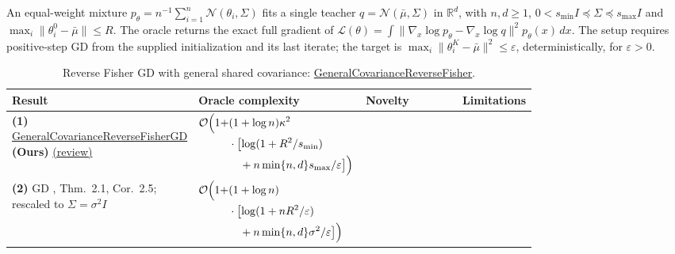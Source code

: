 \begin{table}[tp]
\centering
\caption{Reverse Fisher GD with general shared covariance: \href{https://github.com/k3nfalt/longtails/blob/main/LongTails/Setups/GeneralCovarianceReverseFisher.lean}{GeneralCovarianceReverseFisher}.}\label{tab:GeneralCovarianceReverseFisher}
\parbox{\linewidth}{\footnotesize An equal-weight mixture $p_\theta=n^{-1}\sum_{i=1}^n\mathcal{N}(\theta_i,\Sigma)$ fits a single teacher $q=\mathcal{N}(\bar\mu,\Sigma)$ in $\mathbb{R}^d$, with $n,d\ge1$, $0<s_{\min}I\preceq\Sigma\preceq s_{\max}I$ and $\max_i\|\theta_i^0-\bar\mu\|\le R$. The oracle returns the exact full gradient of $\mathcal{L}(\theta)=\int\|\nabla_x\log p_\theta-\nabla_x\log q\|^2p_\theta(x)\,dx$. The setup requires positive-step GD from the supplied initialization and its last iterate; the target is $\max_i\|\theta_i^K-\bar\mu\|^2\le\varepsilon$, deterministically, for $\varepsilon>0$.}\par\smallskip
\begin{threeparttable}
\footnotesize
\setlength{\tabcolsep}{4pt}\renewcommand{\arraystretch}{1.25}
\begin{tabularx}{\linewidth}{@{}>{\raggedright\arraybackslash}p{0.20\linewidth}>{\raggedright\arraybackslash}p{0.32\linewidth}>{\raggedright\arraybackslash}p{0.25\linewidth}>{\raggedright\arraybackslash}X@{}}
\toprule
\textbf{Result} & \textbf{Oracle complexity} & \textbf{Novelty} & \textbf{Limitations} \\
\midrule
\textbf{(1)} \href{https://github.com/k3nfalt/longtails/blob/main/LongTails/Theorems/GeneralCovarianceReverseFisherGD.lean}{General\allowbreak Covariance\allowbreak Reverse\allowbreak Fisher\allowbreak GD} \textbf{(Ours)} \href{https://github.com/k3nfalt/longtails/blob/main/scripts/reviews/GeneralCovarianceReverseFisherGD.md}{(review)}
& $\begin{aligned}\mathcal{O}\Bigl(1+&(1+\log n)\kappa^2\\ &\cdot\bigl[\log(1+R^2/s_{\min})\\ &\quad+n\min\{n,d\}s_{\max}/\varepsilon\bigr]\Bigr)\end{aligned}$ & & \\
\midrule[1.2pt]
\textbf{(2)} GD \citep{srfTyurin2026v1}, Thm.~2.1, Cor.~2.5; rescaled to $\Sigma=\sigma^2I$
& $\begin{aligned}\mathcal{O}\Bigl(1+&(1+\log n)\\ &\cdot\bigl[\log(1+nR^2/\varepsilon)\\ &\quad+n\min\{n,d\}\sigma^2/\varepsilon\bigr]\Bigr)\end{aligned}$

\end{tabularx}
\end{threeparttable}
\end{table}
